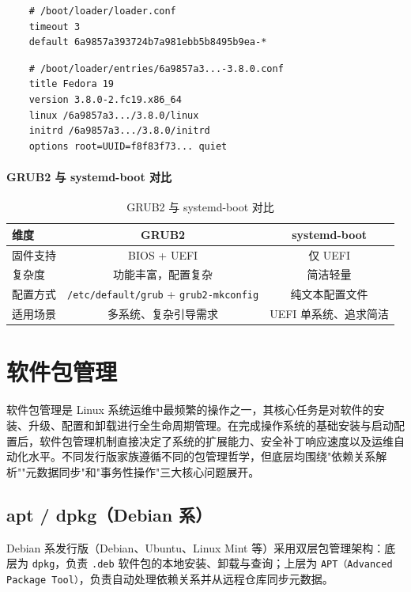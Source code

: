 \documentclass[12pt,UTF8]{ctexbook}
\begin{document}
\begin{verbatim}
	# /boot/loader/loader.conf
	timeout 3
	default 6a9857a393724b7a981ebb5b8495b9ea-*
\end{verbatim}
	
\begin{verbatim}
	# /boot/loader/entries/6a9857a3...-3.8.0.conf
	title Fedora 19
	version 3.8.0-2.fc19.x86_64
	linux /6a9857a3.../3.8.0/linux
	initrd /6a9857a3.../3.8.0/initrd
	options root=UUID=f8f83f73... quiet
\end{verbatim}
	
\paragraph{GRUB2 与 systemd-boot 对比}

\begin{table}[htbp]
	\centering
	\caption{GRUB2 与 systemd-boot 对比}
	\begin{tabular}{@{}lcc@{}}
		\toprule
		\textbf{维度} & \textbf{GRUB2} & \textbf{systemd-boot} \\
		\midrule
		固件支持 & BIOS + UEFI & 仅 UEFI \\
		复杂度 & 功能丰富，配置复杂 & 简洁轻量 \\
		配置方式 & \texttt{/etc/default/grub} + \texttt{grub2-mkconfig} & 纯文本配置文件 \\
		适用场景 & 多系统、复杂引导需求 & UEFI 单系统、追求简洁 \\
		\bottomrule
	\end{tabular}
\end{table}
	
\section{软件包管理}

软件包管理是 Linux 系统运维中最频繁的操作之一，其核心任务是对软件的安装、升级、配置和卸载进行全生命周期管理。在完成操作系统的基础安装与启动配置后，软件包管理机制直接决定了系统的扩展能力、安全补丁响应速度以及运维自动化水平。不同发行版家族遵循不同的包管理哲学，但底层均围绕"依赖关系解析""元数据同步"和"事务性操作"三大核心问题展开。

\subsection{apt / dpkg（Debian 系）}

Debian 系发行版（Debian、Ubuntu、Linux Mint 等）采用双层包管理架构：底层为 \texttt{dpkg}，负责 \texttt{.deb} 软件包的本地安装、卸载与查询；上层为 \texttt{APT（Advanced Package Tool）}，负责自动处理依赖关系并从远程仓库同步元数据。
\end{document}
